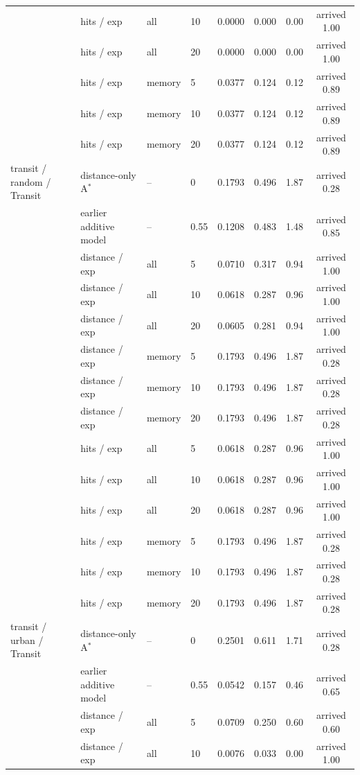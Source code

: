 \begin{tabular}{llllcccc}
 & hits / exp & all & 10 & 0.0000 & 0.000 & 0.00 & arrived 1.00 \\
 & hits / exp & all & 20 & 0.0000 & 0.000 & 0.00 & arrived 1.00 \\
 & hits / exp & memory & 5 & 0.0377 & 0.124 & 0.12 & arrived 0.89 \\
 & hits / exp & memory & 10 & 0.0377 & 0.124 & 0.12 & arrived 0.89 \\
 & hits / exp & memory & 20 & 0.0377 & 0.124 & 0.12 & arrived 0.89 \\
\midrule
transit / random / Transit & distance-only A$^*$ & -- & 0 & 0.1793 & 0.496 & 1.87 & arrived 0.28 \\
 & earlier additive model & -- & 0.55 & 0.1208 & 0.483 & 1.48 & arrived 0.85 \\
 & distance / exp & all & 5 & 0.0710 & 0.317 & 0.94 & arrived 1.00 \\
 & distance / exp & all & 10 & 0.0618 & 0.287 & 0.96 & arrived 1.00 \\
 & distance / exp & all & 20 & 0.0605 & 0.281 & 0.94 & arrived 1.00 \\
 & distance / exp & memory & 5 & 0.1793 & 0.496 & 1.87 & arrived 0.28 \\
 & distance / exp & memory & 10 & 0.1793 & 0.496 & 1.87 & arrived 0.28 \\
 & distance / exp & memory & 20 & 0.1793 & 0.496 & 1.87 & arrived 0.28 \\
 & hits / exp & all & 5 & 0.0618 & 0.287 & 0.96 & arrived 1.00 \\
 & hits / exp & all & 10 & 0.0618 & 0.287 & 0.96 & arrived 1.00 \\
 & hits / exp & all & 20 & 0.0618 & 0.287 & 0.96 & arrived 1.00 \\
 & hits / exp & memory & 5 & 0.1793 & 0.496 & 1.87 & arrived 0.28 \\
 & hits / exp & memory & 10 & 0.1793 & 0.496 & 1.87 & arrived 0.28 \\
 & hits / exp & memory & 20 & 0.1793 & 0.496 & 1.87 & arrived 0.28 \\
\midrule
transit / urban / Transit & distance-only A$^*$ & -- & 0 & 0.2501 & 0.611 & 1.71 & arrived 0.28 \\
 & earlier additive model & -- & 0.55 & 0.0542 & 0.157 & 0.46 & arrived 0.65 \\
 & distance / exp & all & 5 & 0.0709 & 0.250 & 0.60 & arrived 0.60 \\
 & distance / exp & all & 10 & 0.0076 & 0.033 & 0.00 & arrived 1.00 \\

\end{tabular}
